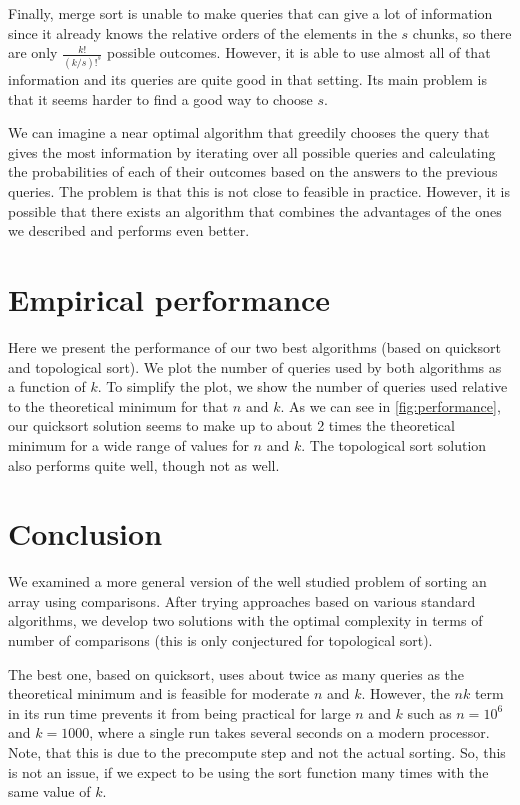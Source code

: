 \documentclass{article}
\begin{document}
Finally, merge sort is unable to make queries that can give a lot of information since it already knows the relative orders of the elements in the $ s $ chunks, so there are only $ \frac{k!}{ {(k / s)!}^s } $ possible outcomes. However, it is able to use almost all of that information and its queries are quite good in that setting. Its main problem is that it seems harder to find a good way to choose $ s $.

We can imagine a near optimal algorithm that greedily chooses the query that gives the most information by iterating over all possible queries and calculating the probabilities of each of their outcomes based on the answers to the previous queries. The problem is that this is not close to feasible in practice. However, it is possible that there exists an algorithm that combines the advantages of the ones we described and performs even better.

\section{Empirical performance}

Here we present the performance of our two best algorithms (based on quicksort and topological sort). We plot the number of queries used by both algorithms as a function of $ k $. To simplify the plot, we show the number of queries used relative to the theoretical minimum for that $ n $ and $ k $. As we can see in \ref{fig:performance}, our quicksort solution seems to make up to about 2 times the theoretical minimum for a wide range of values for $n$ and $k$. The topological sort solution also performs quite well, though not as well.

\section{Conclusion}

We examined a more general version of the well studied problem of sorting an array using comparisons. After trying approaches based on various standard algorithms, we develop two solutions with the optimal complexity in terms of number of comparisons (this is only conjectured for topological sort).

The best one, based on quicksort, uses about twice as many queries as the theoretical minimum and is feasible for moderate $ n $ and $ k $. However, the $ nk $ term in its run time prevents it from being practical for large $ n $ and $ k $ such as $ n = 10^6 $ and $ k = 1000 $, where a single run takes several seconds on a modern processor. Note, that this is due to the precompute step and not the actual sorting. So, this is not an issue, if we expect to be using the sort function many times with the same value of $ k $.
\end{document}

